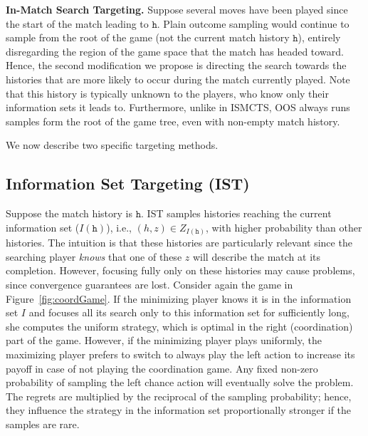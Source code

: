 \documentclass[letterpaper]{article}
\newcommand{\tth}{\mathtt{h}}
\begin{document}
{\bf In-Match Search Targeting.}
Suppose several moves have been played since the start of the match leading to $\tth$. 
Plain outcome sampling would continue to sample from the root of the game (not the current match history $\tth$), entirely 
disregarding the region of the game space that the match has headed toward. 
Hence, the second modification we propose is directing the search towards the histories that are more likely to occur during the match currently played.
Note that this history is typically unknown to the players, who know only their information sets it leads to. 
Furthermore, unlike in ISMCTS, OOS always runs samples form the root of the game tree, even with non-empty match history.

We now describe two specific targeting methods.

\subsection{Information Set Targeting (IST)}

Suppose the match history is $\tth$. IST samples histories reaching the current information set ($I(\tth)$), 
i.e., $(h,z) \in Z_{I(\tth)}$, with higher probability than other histories.
The intuition is that these histories are particularly 
relevant since the searching player {\it knows} that one of these $z$ will describe the match at its completion. 
However, focusing fully only on these histories may cause problems, since convergence guarantees are lost.
Consider again the game in Figure~\ref{fig:coordGame}. 
If the minimizing player knows it is in the information set $I$ and focuses all its search only to this information set for sufficiently long, she computes the uniform strategy, which is optimal in the right (coordination) part of the game.
However, if the minimizing player plays uniformly, the maximizing player prefers to switch to always play the left action to increase its payoff in case of not playing the coordination game. Any fixed non-zero probability of sampling the left chance action will 
eventually solve the problem. The regrets are multiplied by the reciprocal of the sampling probability; hence, they influence the strategy 
in the information set proportionally stronger if the samples are rare. 
\end{document}

